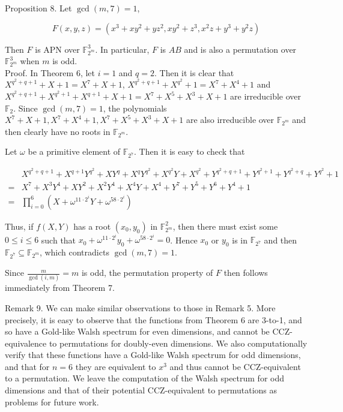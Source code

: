 \documentclass[10pt]{article}
\begin{document}
Proposition 8. Let $\operatorname{gcd}(m, 7)=1$,

$$
F(x, y, z)=\left(x^{3}+x y^{2}+y z^{2}, x y^{2}+z^{3}, x^{2} z+y^{3}+y^{2} z\right)
$$

Then $F$ is APN over $\mathbb{F}_{2^{m}}^{3}$. In particular, $F$ is $A B$ and is also a permutation over $\mathbb{F}_{2^{m}}^{3}$ when $m$ is odd.\\
Proof. In Theorem 6, let $i=1$ and $q=2$. Then it is clear that $X^{q^{2}+q+1}+X+1=X^{7}+X+1$, $X^{q^{2}+q+1}+X^{q^{2}}+1=X^{7}+X^{4}+1$ and $X^{q^{2}+q+1}+X^{q^{2}+1}+X^{q+1}+X+1=X^{7}+X^{5}+X^{3}+X+1$ are irreducible over $\mathbb{F}_{2}$. Since $\operatorname{gcd}(m, 7)=1$, the polynomials $X^{7}+X+1, X^{7}+X^{4}+1, X^{7}+X^{5}+X^{3}+X+1$ are also irreducible over $\mathbb{F}_{2^{m}}$ and then clearly have no roots in $\mathbb{F}_{2^{m}}$.

Let $\omega$ be a primitive element of $\mathbb{F}_{2^{7}}$. Then it is easy to check that

$$
\begin{aligned}
& X^{q^{2}+q+1}+X^{q+1} Y^{q^{2}}+X Y^{q}+X^{q} Y^{q^{2}}+X^{q^{2}} Y+X^{q^{2}}+Y^{q^{2}+q+1}+Y^{q^{2}+1}+Y^{q^{2}+q}+Y^{q^{2}}+1 \\
= & X^{7}+X^{3} Y^{4}+X Y^{2}+X^{2} Y^{4}+X^{4} Y+X^{4}+Y^{7}+Y^{5}+Y^{6}+Y^{4}+1 \\
= & \prod_{i=0}^{6}\left(X+\omega^{11 \cdot 2^{i}} Y+\omega^{58 \cdot 2^{i}}\right)
\end{aligned}
$$

Thus, if $f(X, Y)$ has a root $\left(x_{0}, y_{0}\right)$ in $\mathbb{F}_{2^{m}}^{2}$, then there must exist some $0 \leq i \leq 6$ such that $x_{0}+\omega^{11 \cdot 2^{i}} y_{0}+ \omega^{58 \cdot 2^{i}}=0$. Hence $x_{0}$ or $y_{0}$ is in $\mathbb{F}_{2^{7}}$ and then $\mathbb{F}_{2^{7}} \subseteq \mathbb{F}_{2^{m}}$, which contradicts $\operatorname{gcd}(m, 7)=1$.

Since $\frac{m}{\operatorname{gcd}(i, m)}=m$ is odd, the permutation property of $F$ then follows immediately from Theorem 7.

Remark 9. We can make similar observations to those in Remark 5. More precisely, it is easy to observe that the functions from Theorem 6 are 3-to-1, and so have a Gold-like Walsh spectrum for even dimensions, and cannot be CCZ-equivalence to permutations for doubly-even dimensions. We also computationally verify that these functions have a Gold-like Walsh spectrum for odd dimensions, and that for $n=6$ they are equivalent to $x^{3}$ and thus cannot be CCZ-equivalent to a permutation. We leave the computation of the Walsh spectrum for odd dimensions and that of their potential CCZ-equivalent to permutations as problems for future work.
\end{document}
